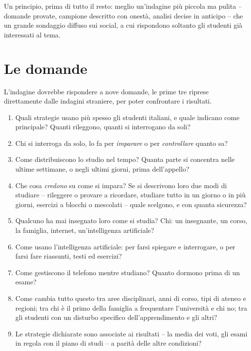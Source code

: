 Un principio, prima di tutto il resto: meglio un'indagine più piccola
ma pulita -- domande provate, campione descritto con onestà, analisi
decise in anticipo -- che un grande sondaggio diffuso sui social, a cui
rispondono soltanto gli studenti già interessati al tema.

\section{Le domande}

L'indagine dovrebbe rispondere a nove domande, le prime tre riprese
direttamente dalle indagini straniere, per poter confrontare i
risultati.

\begin{enumerate}[leftmargin=1.6em, itemsep=0.2\baselineskip]
  \item Quali strategie usano più spesso gli studenti italiani, e quale
        indicano come principale? Quanti rileggono, quanti si
        interrogano da soli?
  \item Chi si interroga da solo, lo fa per \emph{imparare} o per
        \emph{controllare} quanto sa?
  \item Come distribuiscono lo studio nel tempo? Quanta parte si
        concentra nelle ultime settimane, o negli ultimi giorni, prima
        dell'appello?
  \item Che cosa \emph{credono} su come si impara? Se si descrivono
        loro due modi di studiare -- rileggere o provare a ricordare,
        studiare tutto in un giorno o in più giorni, esercizi a blocchi
        o mescolati -- quale scelgono, e con quanta sicurezza?
  \item Qualcuno ha mai insegnato loro come si studia? Chi: un
        insegnante, un corso, la famiglia, internet, un'intelligenza
        artificiale?
  \item Come usano l'intelligenza artificiale: per farsi spiegare e
        interrogare, o per farsi fare riassunti, testi ed esercizi?
  \item Come gestiscono il telefono mentre studiano? Quanto dormono
        prima di un esame?
  \item Come cambia tutto questo tra aree disciplinari, anni di corso,
        tipi di ateneo e regioni; tra chi è il primo della famiglia a
        frequentare l'università e chi no; tra gli studenti con un
        disturbo specifico dell'apprendimento e gli altri?
  \item Le strategie dichiarate sono associate ai risultati -- la media
        dei voti, gli esami in regola con il piano di studi -- a parità
        delle altre condizioni?
\end{enumerate}

